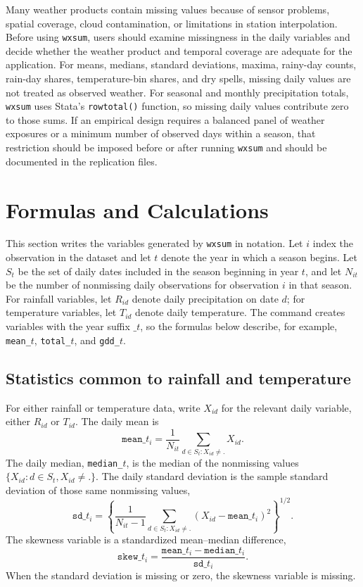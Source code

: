 Many weather products contain missing values because of sensor problems, spatial coverage, cloud contamination, or limitations in station interpolation. Before using \texttt{wxsum}, users should examine missingness in the daily variables and decide whether the weather product and temporal coverage are adequate for the application. For means, medians, standard deviations, maxima, rainy-day counts, rain-day shares, temperature-bin shares, and dry spells, missing daily values are not treated as observed weather. For seasonal and monthly precipitation totals, \texttt{wxsum} uses Stata's \texttt{rowtotal()} function, so missing daily values contribute zero to those sums. If an empirical design requires a balanced panel of weather exposures or a minimum number of observed days within a season, that restriction should be imposed before or after running \texttt{wxsum} and should be documented in the replication files.


\section{Formulas and Calculations}

This section writes the variables generated by \texttt{wxsum} in notation. Let $i$ index the observation in the dataset and let $t$ denote the year in which a season begins. Let $S_t$ be the set of daily dates included in the season beginning in year $t$, and let $N_{it}$ be the number of nonmissing daily observations for observation $i$ in that season. For rainfall variables, let $R_{id}$ denote daily precipitation on date $d$; for temperature variables, let $T_{id}$ denote daily temperature. The command creates variables with the year suffix $\_t$, so the formulas below describe, for example, \texttt{mean\_}$t$, \texttt{total\_}$t$, and \texttt{gdd\_}$t$.

\subsection{Statistics common to rainfall and temperature}

For either rainfall or temperature data, write $X_{id}$ for the relevant daily variable, either $R_{id}$ or $T_{id}$. The daily mean is
\[
\texttt{mean\_}t_i = \frac{1}{N_{it}}\sum_{d\in S_t:X_{id}\ne .} X_{id} .
\]
The daily median, \texttt{median\_}$t$, is the median of the nonmissing values $\{X_{id}:d\in S_t, X_{id}\ne .\}$. The daily standard deviation is the sample standard deviation of those same nonmissing values,
\[
\texttt{sd\_}t_i = \left\{ \frac{1}{N_{it}-1}\sum_{d\in S_t:X_{id}\ne .}\left(X_{id}-\texttt{mean\_}t_i\right)^2 \right\}^{1/2} .
\]
The skewness variable is a standardized mean--median difference,
\[
\texttt{skew\_}t_i = \frac{\texttt{mean\_}t_i-\texttt{median\_}t_i}{\texttt{sd\_}t_i} .
\]
When the standard deviation is missing or zero, the skewness variable is missing.

